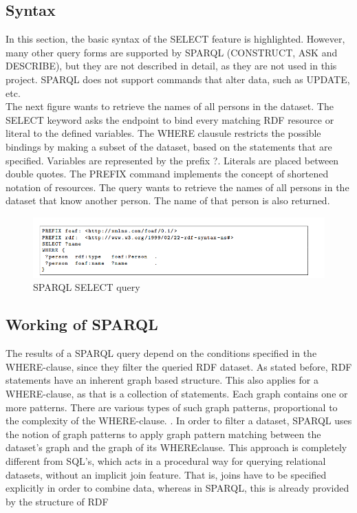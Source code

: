 \documentclass[a4paper,12pt,oneside]{report}
\begin{document}
{{{\subsection{Syntax}
{In this section, the basic syntax of the SELECT feature is highlighted. However, many other
query forms are supported by SPARQL (CONSTRUCT, ASK and DESCRIBE), but they are not described in detail, as they are not used in this project. SPARQL does not support commands that alter data, such as UPDATE, etc.\\
The next figure wants to retrieve the names of all persons in the dataset. The SELECT keyword asks the endpoint to bind every matching RDF resource or literal to the defined variables.
The WHERE clausule restricts the possible bindings by making a subset of the dataset, based on the statements that are specified. Variables are represented by the prefix ?. Literals are placed between double quotes. The PREFIX command implements the concept of shortened
notation of resources. The query wants to retrieve the names of all persons in the dataset that know another person. The name of that person is also returned.}
\begin{figure}[ht]
\centering
\includegraphics[width=1\textwidth]{Capture5}
\caption{SPARQL SELECT query}
\end{figure}
\subsection{Working of SPARQL}
{The results of a SPARQL query depend on the conditions specified in the WHERE-clause, since they filter the queried RDF dataset. As stated before, RDF statements have an inherent graph based structure. This also applies for a WHERE-clause, as that is a collection of statements. Each graph contains one or more patterns. There are various types of such graph patterns, proportional to the complexity of the WHERE-clause. . In order to filter a dataset, SPARQL uses the notion of graph patterns
to apply graph pattern matching between the dataset’s graph and the graph of its WHEREclause. This approach is completely different from SQL’s, which acts in a procedural way for querying relational datasets, without an implicit join feature. That is, joins have to be
specified explicitly in order to combine data, whereas in SPARQL, this is already provided by the structure of RDF}
}}}
\end{document}
